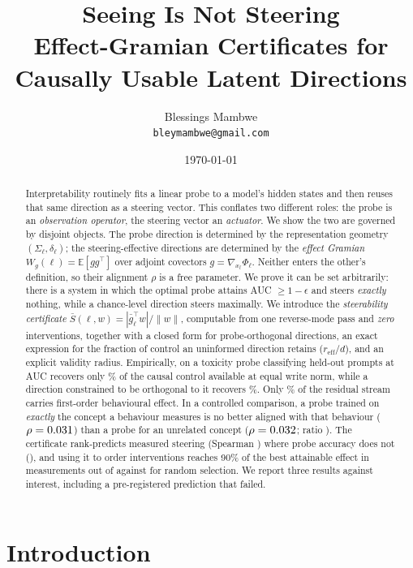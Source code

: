 \documentclass[11pt]{article}
\title{\textbf{Seeing Is Not Steering}\\[2mm]
\large Effect-Gramian Certificates for Causally Usable Latent Directions}
\author{Blessings Mambwe\\
\small \texttt{bleymambwe@gmail.com}}
\date{\today}
\theoremstyle{definition}
\theoremstyle{remark}
\newcommand{\Sbar}{\bar{S}}
\newcommand{\gbar}{\bar{g}}
\newcommand{\Wg}{W_{g}}
\newcommand{\reff}{r_{\mathrm{eff}}}
\begin{document}
\maketitle

\begin{abstract}
\noindent
Interpretability routinely fits a linear probe to a model's hidden states and
then reuses that same direction as a steering vector. This conflates two
different roles: the probe is an \emph{observation operator}, the steering
vector an \emph{actuator}. We show the two are governed by disjoint objects.
The probe direction is determined by the representation geometry
$(\Sigma_\ell,\delta_\ell)$; the steering-effective directions are determined by
the \emph{effect Gramian} $\Wg(\ell)=\mathbb{E}[gg^\top]$ over adjoint covectors
$g=\nabla_{x_\ell}\Phi_\ell$. Neither enters the other's definition, so their
alignment $\rho$ is a free parameter. We prove it can be set arbitrarily:
there is a system in which the optimal probe attains AUC $\ge 1-\epsilon$ and
steers \emph{exactly} nothing, while a chance-level direction steers maximally.
We introduce the \emph{steerability certificate}
$\Sbar(\ell,w)=|\gbar_\ell^\top w|/\|w\|$, computable from one reverse-mode pass
and \emph{zero} interventions, together with a closed form for probe-orthogonal
directions, an exact expression for the fraction of control an uninformed
direction retains ($\reff/d$), and an explicit validity radius. Empirically, on
\EthreeModel{} a toxicity probe classifying held-out prompts at AUC
\EthreeMaxAUC{} recovers only \EthreeEffProbe\% of the causal control available
at equal write norm, while a direction constrained to be orthogonal to it
recovers \EthreeEffDark\%. Only \EthreeMeanReff\% of the residual stream carries
first-order behavioural effect. In a controlled comparison, a probe trained on
\emph{exactly} the concept a behaviour measures is no better aligned with that
behaviour ($\rho=0.031$) than a probe for an unrelated concept
($\rho=0.032$; ratio \EsixRatio). The certificate rank-predicts
measured steering (Spearman \EthreeSpSbar) where probe accuracy does not
(\EthreeSpAUC), and using it to order interventions reaches 90\% of the best
attainable effect in \EfourCertNinety{} measurements out of \EfourM{} against
\EfourRandNinety{} for random selection. We report three results against
interest, including a pre-registered prediction that failed.
\end{abstract}

\section{Introduction}
\end{document}
